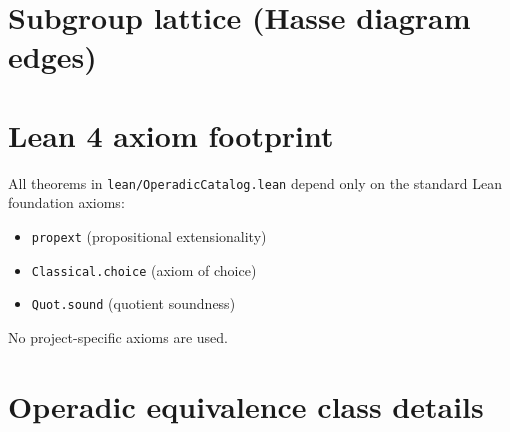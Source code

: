 \documentclass[11pt,a4paper]{article}
\begin{document}
\section{Subgroup lattice (Hasse diagram edges)}\label{sec:lattice}


\section{Lean 4 axiom footprint}\label{sec:axioms}

All theorems in \texttt{lean/OperadicCatalog.lean} depend only on the
standard Lean foundation axioms:
\begin{itemize}
  \item \texttt{propext} (propositional extensionality)
  \item \texttt{Classical.choice} (axiom of choice)
  \item \texttt{Quot.sound} (quotient soundness)
\end{itemize}
No project-specific axioms are used.

\section{Operadic equivalence class details}\label{sec:classes}

\end{document}
